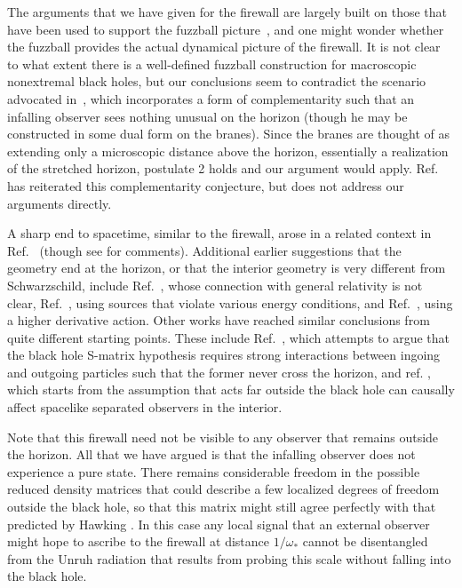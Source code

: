 \documentclass[12pt]{article}
\begin{document}
The arguments that we have given for the firewall are largely built on those {that have been used} to support the fuzzball picture~\cite{Mathur:2009hf}, and one might wonder whether the fuzzball provides the actual dynamical picture of the firewall.  It is not clear to what extent there is a well-defined fuzzball construction for macroscopic nonextremal black holes, {but our conclusions seem to contradict the scenario advocated in}~\cite{Mathur:2012zp}, which incorporates a form of complementarity such that an infalling observer sees nothing unusual on the horizon (though he may be constructed in some dual form on the branes).  Since the branes are thought of as extending only a microscopic
 distance above the horizon, essentially a realization of the stretched horizon, postulate 2 holds and our argument would apply.   Ref.~\cite{Mathur:2012jk} has reiterated this complementarity conjecture, but does not address our arguments directly.

A sharp end to spacetime, similar to the firewall, arose in a related context in Ref.~\cite{Czech:2012be} {(though see \cite{MarWall} for comments)}.  Additional earlier suggestions that the
geometry end at the horizon, or that the interior geometry is very different from Schwarzschild, include Ref.~\cite{Chapline:2000en}, whose connection with general relativity is not clear, Ref.~\cite{Mazur:2001fv}, using sources that violate various energy conditions, and Ref.~\cite{Davidson:2011eu}, using a higher derivative action.  Other works have reached similar conclusions from quite different starting points. These include Ref.~\cite{Itzhaki:1996jt}, which attempts to argue that the black hole S-matrix hypothesis requires strong interactions between ingoing and outgoing particles such that the former never cross the horizon, and ref. \cite{Lowe:2006xm}, which starts from the assumption that acts far outside the black hole can causally affect spacelike separated observers in the interior. 


Note that this firewall need not be visible to any observer that remains outside the horizon.  All that we have argued is that the infalling observer does not experience a pure state.  There remains considerable freedom in the possible reduced density matrices that could describe a few localized degrees of freedom outside the black hole, so that this matrix might still agree perfectly with that predicted by Hawking \cite{Hawking:1974sw}.  In this case any local signal that an external observer might hope to ascribe to the firewall at distance $1/\omega_*$ cannot be disentangled from the Unruh radiation that results from probing this scale without falling into the black hole.
\end{document}
